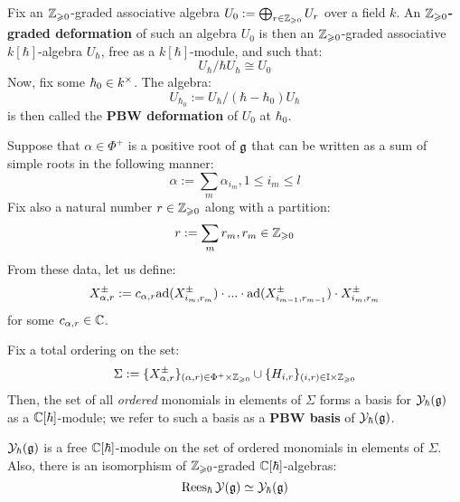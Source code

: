         \begin{definition} \label{def: graded_and_PBW_deformations}
            Fix an $\mathbb{Z}_{\geqslant 0}$-graded associative algebra $U_0 := \bigoplus_{r \in \mathbb{Z}_{\geqslant 0}} U_r$ over a field $k$. An \textbf{$\mathbb{Z}_{\geqslant 0}$-graded deformation} of such an algebra $U_0$ is then an $\mathbb{Z}_{\geqslant 0}$-graded associative $k[\hbar]$-algebra $U_{\hbar}$, free as a $k[\hbar]$-module, and such that:
                $$U_{\hbar}/\hbar U_{\hbar} \cong U_0$$
            Now, fix some $\hbar_0 \in k^{\x}$. The algebra:
                $$U_{\hbar_0} := U_{\hbar}/(\hbar - \hbar_0)U_{\hbar}$$
            is then called the \textbf{PBW deformation} of $U_0$ at $\hbar_0$.  
        \end{definition}
        \begin{convention}
            Suppose that $\alpha \in \Phi^+$ is a positive root of $\mathfrak{g}$ that can be written as a sum of simple roots in the following manner:
                $$\alpha := \sum_m \alpha_{i_m}, 1 \leq i_m \leq l$$
            Fix also a natural number $r \in \mathbb{Z}_{\geqslant 0}$ along with a partition:
                $$r := \sum_m r_m, r_m \in \mathbb{Z}_{\geqslant 0}$$
            From these data, let us define:
                $$X_{\alpha, r}^{\pm} := c_{\alpha, r} \mathrm{ad}( X_{i_m, r_m}^{\pm} ) \cdot ... \cdot \mathrm{ad}( X_{i_{m - 1}, r_{m - 1}}^{\pm} ) \cdot X_{i_m, r_m}^{\pm}$$
            for some $c_{\alpha, r} \in \mathbb{C}$.
        \end{convention}
        \begin{theorem} \label{theorem: PBW_bases_for_formal_yangians}
            Fix a total ordering on the set:
                $$\Sigma := \{X_{\alpha, r}^{\pm}\}_{(\alpha, r) \in \Phi^+ \x \Z_{\geq 0}} \cup \{H_{i, r}\}_{(i, r) \in \simpleroots \x \Z_{\geq 0}}$$
            Then, the set of all \textit{ordered} monomials in elements of $\Sigma$ forms a basis for $\mathcal{Y}_{\hbar}(\mathfrak{g})$ as a $\mathbb{C}[\hbar]$-module; we refer to such a basis as a \textbf{PBW basis} of $\mathcal{Y}_{\hbar}(\mathfrak{g})$. 
        \end{theorem}
        \begin{corollary} \label{coro: formal_yangians_as_graded_deformations}
            $\mathcal{Y}_{\hbar}(\mathfrak{g})$ is a free $\mathbb{C}[\hbar]$-module on the set of ordered monomials in elements of $\Sigma$. Also, there is an isomorphism of $\mathbb{Z}_{\geqslant 0}$-graded $\mathbb{C}[\hbar]$-algebras:
                $$\operatorname{Rees}_{\hbar} \mathcal{Y}(\mathfrak{g}) \simeq \mathcal{Y}_{\hbar}(\mathfrak{g})$$
        \end{corollary}

